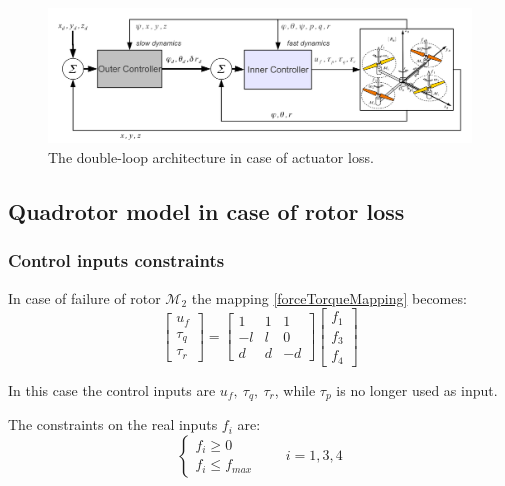 \documentclass[11pt,a4paper]{scrartcl}
\begin{document}
\begin{figure}
	\centering
	\includegraphics[width=0.9\linewidth]{Images/ControlScheme}
	\caption{The double-loop architecture in case of actuator loss.}
	\label{fig:controlscheme}
\end{figure}

\subsection{Quadrotor model in case of rotor loss}

\subsubsection{Control inputs constraints}

In case of failure of rotor $\mathcal{M}_2$ the mapping \eqref{forceTorqueMapping} becomes:
\begin{equation}
\begin{bmatrix}
u_f \\ \tau_q \\ \tau_r
\end{bmatrix} = 
\begin{bmatrix}
1 & 1 & 1 \\
-l & l & 0 \\
d  & d & -d
\end{bmatrix}
\begin{bmatrix}
f_1 \\ f_3 \\ f_4
\end{bmatrix}
\label{forceTorqueMappingFailure}
\end{equation}

In this case the control inputs are $ u_f, \ \tau_q, \ \tau_r $, while $ \tau_p $ is no longer used as input.

The constraints on the real inputs $ f_i $ are:
\begin{equation}
	\begin{cases}
	f_i \geq 0 \\
	f_i \leq f_{max} 
	\end{cases} \qquad i = 1,3,4
	\label{constraints}
\end{equation}
\end{document}

